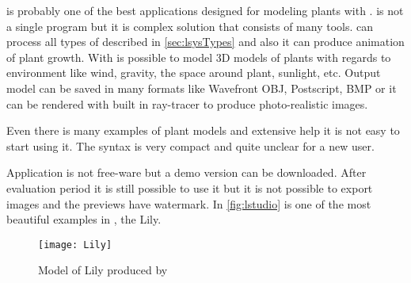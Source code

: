 \noindent
\lstudio is probably one of the best applications designed for modeling plants with \lsystems.
\lstudio is not a single program but it is complex solution that consists of many tools.
\lstudio can process all types of \lsystems described in \autoref{sec:lsysTypes} and also it can produce animation of plant growth.
With \lstudio is possible to model 3D models of plants with regards to environment like wind, gravity, the space around plant, sunlight, etc.
Output model can be saved in many formats like Wavefront OBJ, Postscript, BMP or it can be rendered with built in ray-tracer to produce photo-realistic images.

Even there is many examples of plant models and extensive help it is not easy to start using it.
The syntax is very compact and quite unclear for a new user.

Application is not free-ware but a demo version can be downloaded.
After evaluation period it is still possible to use it but it is not possible to export images and the previews have watermark.
In \autoref{fig:lstudio} is one of the most beautiful examples in \lstudio, the Lily.


\begin{figure}[h]
	\centering
	\texttt{[image: Lily]}
	\caption{Model of Lily produced by \lstudio}
	\label{fig:lstudio}
\end{figure}





















